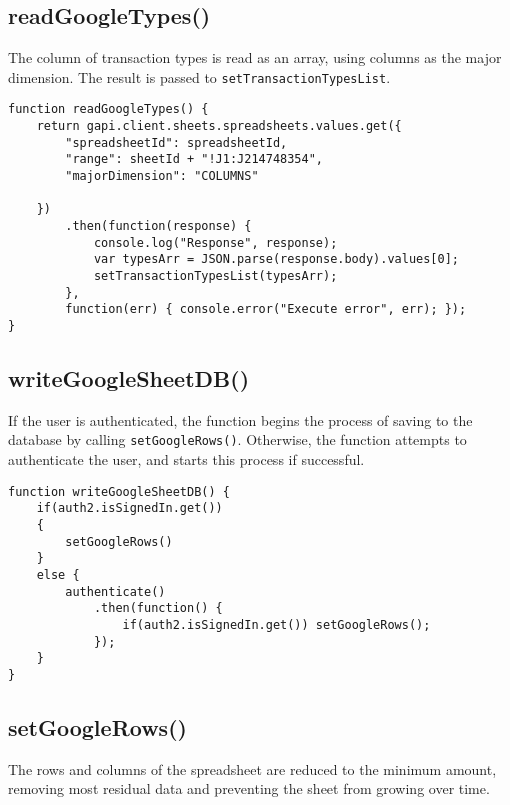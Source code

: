 \documentclass[letterpaper]{article}
\begin{document}
\subsection{readGoogleTypes()}

The column of transaction types is read as an array, using columns as the major dimension.
The result is passed to \lstinline{setTransactionTypesList}.

\begin{lstlisting}[firstnumber=124]
function readGoogleTypes() {
    return gapi.client.sheets.spreadsheets.values.get({
        "spreadsheetId": spreadsheetId,
        "range": sheetId + "!J1:J214748354",
        "majorDimension": "COLUMNS"

    })
        .then(function(response) {
            console.log("Response", response);
            var typesArr = JSON.parse(response.body).values[0];
            setTransactionTypesList(typesArr);
        },
        function(err) { console.error("Execute error", err); });
}
\end{lstlisting}

\subsection{writeGoogleSheetDB()}

If the user is authenticated, the function begins the process of saving to the database by calling \lstinline{setGoogleRows()}.
Otherwise, the function attempts to authenticate the user, and starts this process if successful.

\begin{lstlisting}[firstnumber=139]
function writeGoogleSheetDB() {
    if(auth2.isSignedIn.get())
    {
        setGoogleRows()
    }
    else {
        authenticate()
            .then(function() {
                if(auth2.isSignedIn.get()) setGoogleRows();
            });
    }
}
\end{lstlisting}

\subsection{setGoogleRows()}

The rows and columns of the spreadsheet are reduced to the minimum amount, removing most residual data and preventing the sheet from growing over time.
\end{document}
